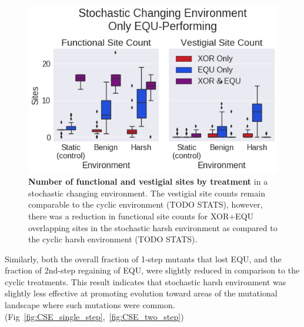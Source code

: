 \documentclass[10pt,letterpaper]{article}
\begin{document}
\begin{figure}[!h]
\includegraphics[trim={0 0 0 0}, clip, width=1\columnwidth]{figures/CSE_func_vest__filtered__box.png}
\caption{{\bf Number of functional and vestigial sites by treatment} in a stochastic changing environment. The vestigial site counts remain comparable to the cyclic environment (TODO STATS), however, there was a reduction in functional site counts for XOR+EQU overlapping sites in the stochastic harsh environment as compared to the cyclic harsh environment (TODO STATS).%
}
\label{fig:CSE_func_vestigial} %
\end{figure}

Similarly, both the overall fraction of 1-step mutants that lost EQU, and the fraction of 2nd-step regaining of EQU, were slightly reduced in comparison to the cyclic treatments.
This result indicates that stochastic harsh environment was slightly less effective at promoting evolution toward areas of the mutational landscape where such mutations were common.
(Fig~\ref{fig:CSE_single_step},~\ref{fig:CSE_two_step})
\end{document}
